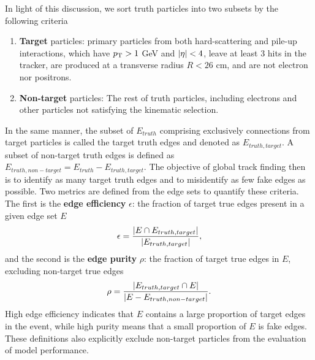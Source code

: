 In light of this discussion, we sort truth particles into two subsets by the following criteria
\begin{enumerate}
    \item \textbf{Target} particles: primary particles from both hard-scattering and pile-up interactions, which have $p_{\text{T}}>1$ GeV and $\abs{\eta}<4$, leave at least 3 hits in the tracker, are produced at a transverse radius $R<26$ cm, and are not electron nor positrons.
    \item \textbf{Non-target} particles: The rest of truth particles, including electrons and other particles not satisfying the kinematic selection.
\end{enumerate}
In the same manner, the subset of $E_{truth}$ comprising exclusively connections from target particles is called the target truth edges and denoted as $E_{truth,target}$. 
A subset of non-target truth edges is defined as $E_{truth, non-target} = E_{truth} - E_{truth,target}$. 
The objective of global track finding then is to identify as many target truth edges and to misidentify as few fake edges as possible.
Two metrics are defined from the edge sets to quantify these criteria.
The first is the \textbf{edge efficiency} $\epsilon$: the fraction of target true edges present in a given edge set $E$
\begin{equation}
\label{eq:9.2}
\epsilon = \frac{\abs{E \cap E_{truth,target}  }} {\abs{E_{truth, target}}},
\end{equation}
and the second is the \textbf{edge purity} $\rho$: the fraction of target true edges in $E$, excluding non-target true edges
\begin{equation}
\label{eq:9.3}
\rho = \frac{\abs{E_{truth,target} \cap E  }} {\abs{ E - E_{truth, non-target} } } .
\end{equation}
High edge efficiency indicates that $E$ contains a large proportion of target edges in the event, while high purity means that a small proportion of $E$ is fake edges.
These definitions also explicitly exclude non-target particles from the evaluation of model performance.

